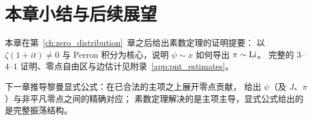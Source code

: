 \begin{center}
\end{center}

\section*{本章小结与后续展望}

本章在第~\ref{ch:zero_distribution}~章之后给出素数定理的证明提要：
以 $\zeta(1+it)\neq 0$ 与 Perron 积分为核心，说明 $\psi\sim x$ 如何导出 $\pi\sim\operatorname{Li}$。
完整的 $3$--$4$--$1$ 证明、零点自由区与边估计见附录~\ref{app:pnt_estimates}。

下一章推导黎曼显式公式：在已合法的主项之上展开零点贡献，
给出 $\psi$（及 $J$、$\pi$）与非平凡零点之间的精确对应；
素数定理解决的是主项主导，显式公式给出的是完整振荡结构。

